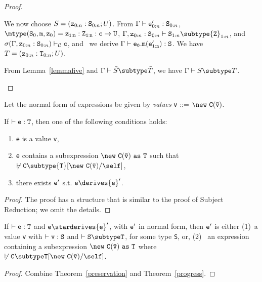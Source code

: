 \begin{proof}
\begin{itemize}
\begin{itemize}
            We now choose 
               $S=({\tt z}_{0:n}: {\tt S}_{0:n}; U)$.
            From 
            $\Gamma \vdash {\tt e}_{0:n}': {\tt S}_{0:n}$,
            $\mtype({\tt S}_0,{\tt m},{\tt z}_0) =
               \tt {\tt z}_{1:n}: {\tt Z}_{1:n}:c \rightarrow {\tt U}$,
            $\Gamma, {\tt z}_{0:n}: {\tt S}_{0:n} \vdash
                  {\tt S}_{1:n} \subtype {\tt Z}_{1:n}$, and
            $\sigma(\Gamma, {\tt z}_{0:n}: {\tt S}_{0:n}) \vdash_{\cal C}
                  {\tt c}$,
            and \TInvk\ we derive
            $\Gamma \vdash {\tt e_0.m(e_{1:n}')}: {\tt S}$.
            We have 
               $T=({\tt z}_{0:n}: {\tt T}_{0:n}; U)$.

            From Lemma~\ref{lemmafive} and
            $\Gamma \vdash \bar{S} \subtype \bar{T}$, we have
            $\Gamma \vdash S \subtype T$.
   \end{itemize}
\end{itemize}
\end{proof}

\noindent
Let the normal form of expressions be given by {\em values}
{\tt v} {::=} $\new\ {\tt C(\bar{\tt v})}$.

\begin{theorem}[Progress] 
\label{progress}
If $\vdash {\tt e: T}$, then one of the following conditions holds:
\begin{enumerate}
\item {\tt e} is a value {\tt v}, 
\item {\tt e} contains a subexpression ${\tt \new\ C(\bar{\tt v})~as~T}$ such that
$\not\vdash {\tt C} \subtype {\tt T}[{\tt \new\ C(\bar{\tt v})}/\self]$,
\item there exists ${\tt e}'$ s.t. ${\tt e} \derives {\tt e}'$.
\end{enumerate}
\end{theorem}

\begin{proof}
The proof has a structure that is similar to the proof of Subject Reduction;
we omit the details.
\end{proof}

\begin{theorem} 
\label{type-soundness}
If $\vdash {\tt e: T}$ and ${\tt e} \starderives {\tt e}'$, with ${\tt
e}'$ in normal form, then ${\tt e}'$ is either (1)~a value {\tt v}
with $\vdash {\tt v: S}$ and $\vdash {\tt S \subtype T}$,
for some type {\tt S}, or, (2)~ an expression containing
a subexpression ${\tt \new\ {\tt C(\bar{\tt v})~as~T}}$ where 
$\not\vdash \tt C\subtype T[\new\ C(\bar{\tt v})/\self]$.

\end{theorem}

\begin{proof}
Combine Theorem~\ref{preservation} and Theorem~\ref{progress}.
\end{proof}

